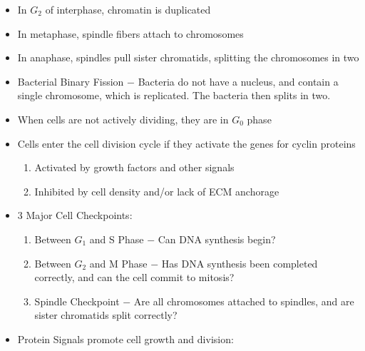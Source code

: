 \documentclass[12pt]{article}
\begin{document}
\begin{itemize}
\begin{enumerate}
    \end{enumerate}

  \item In $G_2$ of interphase, chromatin is duplicated

  \item In metaphase, spindle fibers attach to chromosomes

  \item In anaphase, spindles pull sister chromatids, splitting the chromosomes in two

  \item Bacterial Binary Fission $-$ Bacteria do not have a nucleus, and contain a single chromosome, which is replicated. The bacteria then splits in two.
    
  \item When cells are not actively dividing, they are in $G_0$ phase

  \item Cells enter the cell division cycle if they activate the genes for cyclin proteins

    \begin{enumerate}

      \item Activated by growth factors and other signals

      \item Inhibited by cell density and/or lack of ECM anchorage

    \end{enumerate}

  \item 3 Major Cell Checkpoints:

    \begin{enumerate}

      \item Between $G_1$ and S Phase $-$ Can DNA synthesis begin?

      \item Between $G_2$ and M Phase $-$ Has DNA synthesis been completed correctly, and can the cell commit to mitosis?

      \item Spindle Checkpoint $-$ Are all chromosomes attached to spindles, and are sister chromatids split correctly?

    \end{enumerate}

  \item Protein Signals promote cell growth and division:


\end{itemize}
\end{document}
